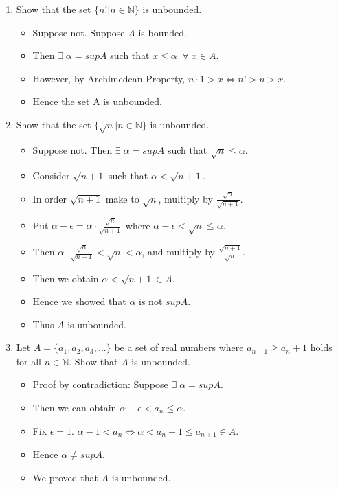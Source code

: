 \documentclass[12pt]{article}
\begin{document}
\begin{enumerate}[label=(\roman*)]
    \newpage
    \item Show that the set $\{n!|n\in\mathbb{N}\}$ is unbounded.
        \begin{itemize}
            \item Suppose not. Suppose $A$ is bounded.
            \item Then $\exists\; \alpha = supA$ such that $x \le \alpha\;\;\forall\;x\in A$.
            \item However, by Archimedean Property, $n\cdot 1 > x \Leftrightarrow n! > n > x$.
            \item Hence the set A is unbounded.
        \end{itemize}
    \item Show that the set $\{\sqrt{n}|n\in\mathbb{N}\}$ is unbounded.
        \begin{itemize}
            \item Suppose not. Then $\exists\; \alpha = supA$ such that $\sqrt{n} \le \alpha$.
            \item Consider $\sqrt{n+1}$ such that $\alpha < \sqrt{n+1}$.
            \item In order $\sqrt{n+1}$ make to $\sqrt{n}$, multiply by $\frac{\sqrt{n}}{\sqrt{n+1}}$.
            \item Put $\alpha - \epsilon = \alpha \cdot \frac{\sqrt{n}}{\sqrt{n+1}}$ where $\alpha-\epsilon < \sqrt{n} \le \alpha$.
            \item Then $\alpha \cdot \frac{\sqrt{n}}{\sqrt{n+1}} < \sqrt{n} < \alpha$, and multiply by $\frac{\sqrt{n+1}}{\sqrt{n}}$.
            \item Then we obtain $\alpha < \sqrt{n+1} \in A$.
            \item Hence we showed that $\alpha$ is not $supA$.
            \item Thus $A$ is unbounded.
        \end{itemize}
    
    \item Let $A = \{a_1,a_2,a_3,...\}$ be a set of real numbers where $a_{n+1} \ge a_n + 1$ holds for all $n \in \mathbb{N}$. Show that $A$ is unbounded.
        \begin{itemize}
            \item Proof by contradiction: Suppose $\exists\;\alpha = supA$.
            \item Then we can obtain $\alpha - \epsilon < a_n \le \alpha$.
            \item Fix $\epsilon =1$. $\alpha - 1 < a_n \Leftrightarrow \alpha < a_n + 1 \le a_{n+1} \in A$. 
            \item Hence $\alpha \neq supA$.
            \item We proved that $A$ is unbounded.
        \end{itemize}
\end{enumerate}
\end{document}
